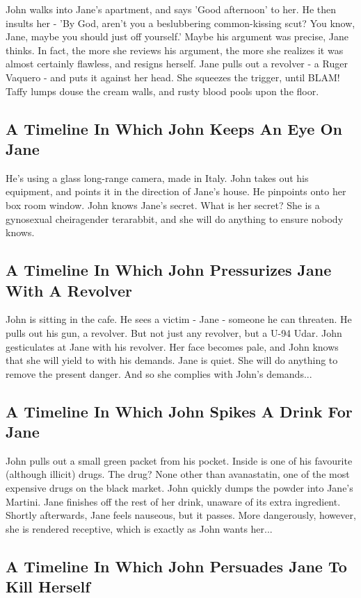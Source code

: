 \documentclass{article}
\begin{document}
John walks into Jane's apartment, and says 'Good afternoon' to her.
He then insults her {-} 'By God, aren't you a beslubbering common{-}kissing scut?
You know, Jane, maybe you should just off yourself.'
Maybe his argument was precise, Jane thinks.
In fact, the more she reviews his argument, the more she realizes it was almost certainly flawless, and resigns herself.
Jane pulls out a revolver {-} a Ruger Vaquero {-} and puts it against her head.
She squeezes the trigger, until BLAM!
Taffy lumps douse the cream walls, and rusty blood pools upon the floor.
\subsection{A Timeline In Which John Keeps An Eye On Jane}


He's using a glass long{-}range camera, made in Italy.
John takes out his equipment, and points it in the direction of Jane's house. He pinpoints onto her box room window.
John knows Jane's secret. What is her secret? She is a gynosexual cheiragender terarabbit, and she will do anything to ensure nobody knows.
\subsection{A Timeline In Which John Pressurizes Jane With A Revolver}


John is sitting in the cafe.
He sees a victim {-} Jane {-} someone he can threaten. He pulls out his gun, a revolver.
But not just any revolver, but a U{-}94 Udar.
John gesticulates at Jane with his revolver. Her face becomes pale, and John knows that she will yield to with his demands.
Jane is quiet. She will do anything to remove the present danger. And so she complies with John's demands...
\subsection{A Timeline In Which John Spikes A Drink For Jane}


John pulls out a small green packet from his pocket. Inside is one of his favourite (although illicit) drugs.
The drug? None other than avanastatin, one of the most expensive drugs on the black market.
John quickly dumps the powder into Jane's Martini.
Jane finishes off the rest of her drink, unaware of its extra ingredient.
Shortly afterwards, Jane feels nauseous, but it passes.
More dangerously, however, she is rendered receptive, which is exactly as John wants her...
\subsection{A Timeline In Which John Persuades Jane To Kill Herself}
\end{document}
